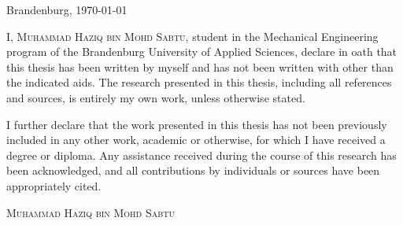\thispagestyle{empty}

\large
\begin{flushright}
  Brandenburg, \today
\end{flushright}

\vspace*{40mm}
I, {\scshape Muhammad Haziq bin Mohd Sabtu}, student in the Mechanical Engineering program of the Brandenburg University of Applied Sciences, declare in oath that this thesis has been written by myself and has not been written with other than the indicated aids. The research presented in this thesis, including all references and sources, is entirely my own work, unless otherwise stated.

I further declare that the work presented in this thesis has not been previously included in any other work, academic or otherwise, for which I have received a degree or diploma. Any assistance received during the course of this research has been acknowledged, and all contributions by individuals or sources have been appropriately cited.

\vspace*{40mm}

\begin{flushright}
  {\scshape Muhammad Haziq bin Mohd Sabtu}
\end{flushright}

\normalsize